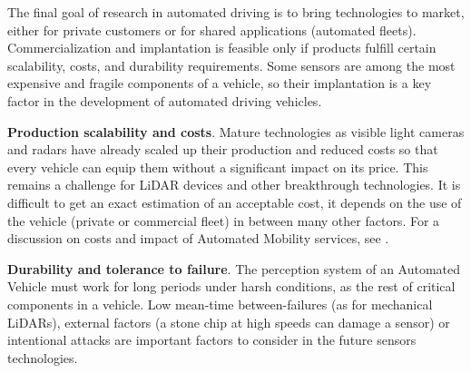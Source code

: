 The final goal of research in automated driving is to bring technologies to
market, either for private customers or for shared applications (automated 
fleets). Commercialization and implantation is feasible only if products 
fulfill certain scalability, costs, and durability requirements.
Some sensors are among the most expensive and fragile components of a vehicle,
so their implantation is a key factor in the development of automated driving
vehicles.

\textbf{Production scalability and costs}. 
Mature technologies as visible light cameras and radars have already scaled up 
their production and reduced costs so that every vehicle can equip them without
a significant impact on its price. This remains a challenge for LiDAR devices
and other breakthrough technologies.
It is difficult to get an exact estimation of an acceptable cost, 
it depends on the use of the vehicle (private or commercial fleet)
in between many other factors. 
For a discussion on costs and impact of Automated Mobility services, see
\cite{Bosch2018}.

\textbf{Durability and tolerance to failure}.
The perception system of an Automated Vehicle must work for long
periods under harsh conditions, as the rest of critical components in a vehicle.
Low mean-time between-failures (as for mechanical LiDARs), external factors 
(a stone chip at high speeds can damage a sensor) or intentional attacks \cite{Petit2015a}
are important factors to consider in the future sensors technologies.



